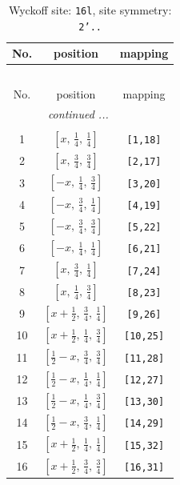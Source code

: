 \documentclass[fleqn,8pt]{jsarticle}
\begin{document}
\renewcommand{\arraystretch}{1.2}
\begin{longtable}{ccc}
\caption{Wyckoff site: {\tt 16l}, site symmetry: {\tt 2'..}}
 \\
 \hline \hline
No. & position & mapping \\ \hline \endfirsthead

\multicolumn{2}{l}{\tablename\ \thetable{}} \\
 \hline \hline
No. & position & mapping \\ \hline \endhead

 \hline \hline
\multicolumn{2}{r}{\footnotesize\it continued ...} \\ \endfoot

 \hline \hline
\multicolumn{2}{r}{} \\ \endlastfoot

1 & $\left[ x,\, \frac{1}{4},\, \frac{1}{4} \right]$ & {\tt [1,18]} \\ \hline
2 & $\left[ x,\, \frac{3}{4},\, \frac{3}{4} \right]$ & {\tt [2,17]} \\ \hline
3 & $\left[ - x,\, \frac{1}{4},\, \frac{3}{4} \right]$ & {\tt [3,20]} \\ \hline
4 & $\left[ - x,\, \frac{3}{4},\, \frac{1}{4} \right]$ & {\tt [4,19]} \\ \hline
5 & $\left[ - x,\, \frac{3}{4},\, \frac{3}{4} \right]$ & {\tt [5,22]} \\ \hline
6 & $\left[ - x,\, \frac{1}{4},\, \frac{1}{4} \right]$ & {\tt [6,21]} \\ \hline
7 & $\left[ x,\, \frac{3}{4},\, \frac{1}{4} \right]$ & {\tt [7,24]} \\ \hline
8 & $\left[ x,\, \frac{1}{4},\, \frac{3}{4} \right]$ & {\tt [8,23]} \\ \hline
9 & $\left[ x + \frac{1}{2},\, \frac{3}{4},\, \frac{1}{4} \right]$ & {\tt [9,26]} \\ \hline
10 & $\left[ x + \frac{1}{2},\, \frac{1}{4},\, \frac{3}{4} \right]$ & {\tt [10,25]} \\ \hline
11 & $\left[ \frac{1}{2} - x,\, \frac{3}{4},\, \frac{3}{4} \right]$ & {\tt [11,28]} \\ \hline
12 & $\left[ \frac{1}{2} - x,\, \frac{1}{4},\, \frac{1}{4} \right]$ & {\tt [12,27]} \\ \hline
13 & $\left[ \frac{1}{2} - x,\, \frac{1}{4},\, \frac{3}{4} \right]$ & {\tt [13,30]} \\ \hline
14 & $\left[ \frac{1}{2} - x,\, \frac{3}{4},\, \frac{1}{4} \right]$ & {\tt [14,29]} \\ \hline
15 & $\left[ x + \frac{1}{2},\, \frac{1}{4},\, \frac{1}{4} \right]$ & {\tt [15,32]} \\ \hline
16 & $\left[ x + \frac{1}{2},\, \frac{3}{4},\, \frac{3}{4} \right]$ & {\tt [16,31]} \\
\end{longtable}
\end{document}
